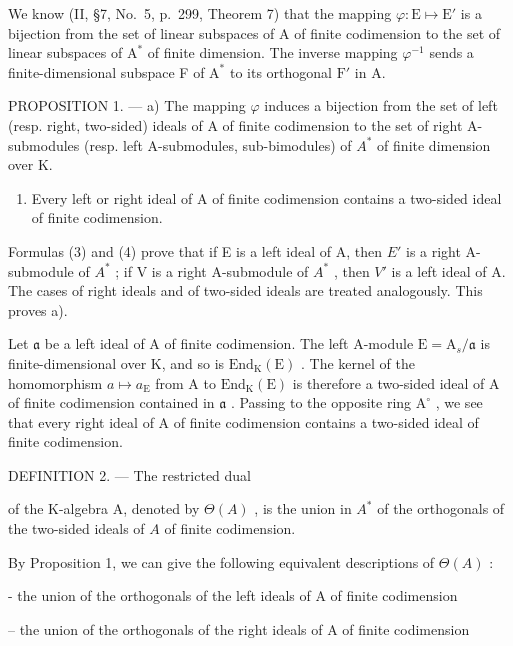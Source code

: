 We know (II, §7, No.~5, p.~299, Theorem 7) that the mapping \(\varphi : \mathrm{E} \mapsto \mathrm{E}'\) is a bijection from the set of linear subspaces of A of finite codimension to the set of linear subspaces of \(\mathrm{A}^*\) of finite dimension. The inverse mapping \(\varphi^{-1}\) sends a finite-dimensional subspace F of \(\mathrm{A}^*\) to its orthogonal \(\mathrm{F}'\) in A.

PROPOSITION 1. --- a) The mapping \(\varphi\) induces a bijection from the set of left (resp. right, two-sided) ideals of A of finite codimension to the set of right A-submodules (resp. left A-submodules, sub-bimodules) of \(A^{*}\) of finite dimension over K.

\begin{enumerate}
\def\labelenumi{\alph{enumi})}
\setcounter{enumi}{1}
\tightlist
\item
  Every left or right ideal of A of finite codimension contains a two-sided ideal of finite codimension.
\end{enumerate}

Formulas (3) and (4) prove that if E is a left ideal of A, then \(E'\) is a right A-submodule of \(A^{*}\) ; if V is a right A-submodule of \(A^{*}\) , then \(V'\) is a left ideal of A. The cases of right ideals and of two-sided ideals are treated analogously. This proves a).

Let \(\mathfrak{a}\) be a left ideal of A of finite codimension. The left A-module \(\mathrm{E} = \mathrm{A}_s / \mathfrak{a}\) is finite-dimensional over K, and so is \(\mathrm{End}_{\mathrm{K}}(\mathrm{E})\) . The kernel of the homomorphism \(a \mapsto a_{\mathrm{E}}\) from A to \(\mathrm{End}_{\mathrm{K}}(\mathrm{E})\) is therefore a two-sided ideal of A of finite codimension contained in \(\mathfrak{a}\) . Passing to the opposite ring \(\mathrm{A}^{\circ}\) , we see that every right ideal of A of finite codimension contains a two-sided ideal of finite codimension.

DEFINITION 2. --- The restricted dual

of the K-algebra A, denoted by \(\Theta(A)\) , is the union in \(A^{*}\) of the orthogonals of the two-sided ideals of \(A\) of finite codimension.

By Proposition 1, we can give the following equivalent descriptions of \(\Theta(A)\) :

- the union of the orthogonals of the left ideals of A of finite codimension

-- the union of the orthogonals of the right ideals of A of finite codimension

